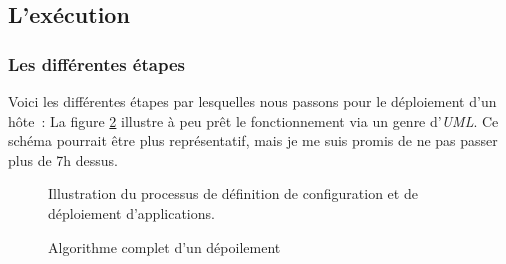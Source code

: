 \subsection{L'exécution}

\subsubsection{Les différentes étapes}

Voici les différentes étapes par lesquelles nous passons pour le déploiement d'un hôte~:
La figure \ref{1.4_algorithme_complet} illustre à peu prêt le fonctionnement via un genre d'\emph{UML}.
Ce schéma pourrait être plus représentatif, mais je me suis promis de ne pas passer plus de 7h dessus.

\begin{figure}
	\centerfloat
	\caption{Illustration du processus de définition de configuration et de déploiement d'applications.}
	\label{1.4_definition_runlist}
	
\end{figure}

\begin{figure}
	\centerfloat
	\caption{Algorithme complet d'un dépoilement}
	\label{1.4_algorithme_complet}
	
\end{figure}

